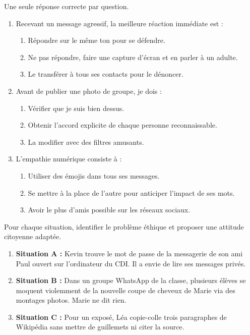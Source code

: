 \documentclass[11pt]{article}
\begin{document}
\begin{exercice}
Une seule réponse correcte par question.
\begin{enumerate}
    \item Recevant un message agressif, la meilleure réaction immédiate est :
    \begin{enumerate}
        \item Répondre sur le même ton pour se défendre.
        \item Ne pas répondre, faire une capture d'écran et en parler à un adulte.
        \item Le transférer à tous ses contacts pour le dénoncer.
    \end{enumerate}
    \item Avant de publier une photo de groupe, je dois :
    \begin{enumerate}
        \item Vérifier que je suis bien dessus.
        \item Obtenir l'accord explicite de chaque personne reconnaissable.
        \item La modifier avec des filtres amusants.
    \end{enumerate}
    \item L'empathie numérique consiste à :
    \begin{enumerate}
        \item Utiliser des émojis dans tous ses messages.
        \item Se mettre à la place de l'autre pour anticiper l'impact de ses mots.
        \item Avoir le plus d'amis possible sur les réseaux sociaux.
    \end{enumerate}
\end{enumerate}
\end{exercice}

\begin{exercice}
Pour chaque situation, identifier le problème éthique et proposer une attitude citoyenne adaptée.
\begin{enumerate}
    \item \textbf{Situation A :} Kevin trouve le mot de passe de la messagerie de son ami Paul ouvert sur l'ordinateur du CDI. Il a envie de lire ses messages privés.
    \item \textbf{Situation B :} Dans un groupe WhatsApp de la classe, plusieurs élèves se moquent violemment de la nouvelle coupe de cheveux de Marie via des montages photos. Marie ne dit rien.
    \item \textbf{Situation C :} Pour un exposé, Léa copie-colle trois paragraphes de Wikipédia sans mettre de guillemets ni citer la source.
\end{enumerate}
\end{exercice}
\end{document}
